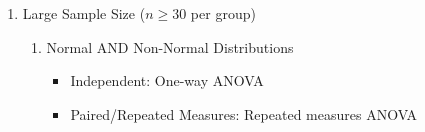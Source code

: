 \documentclass{article}
\begin{document}
\begin{enumerate}
\begin{enumerate}
\begin{enumerate}
\begin{enumerate}
            \end{enumerate}
            \item Large Sample Size ($n \geq 30$ per group)
            \begin{enumerate}
                \item Normal AND Non-Normal Distributions
                \begin{itemize}
                    \item Independent: One-way ANOVA
                    \item Paired/Repeated Measures: Repeated measures ANOVA
                \end{itemize}
            \end{enumerate}
        \end{enumerate}
    \end{enumerate}


\end{enumerate}
\end{document}
